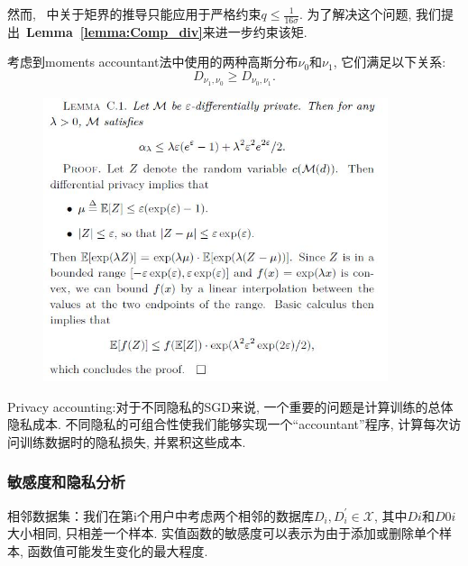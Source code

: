 
然而, ~\cite{abadi2016DLwithDP}中关于矩界的推导只能应用于严格约束$q \leq \frac{1}{16\sigma}$. 
为了解决这个问题, 我们提出~\textbf{Lemma~\ref{lemma:Comp_div}}来进一步约束该矩. 
\begin{lemma}

考虑到moments accountant法中使用的两种高斯分布$\nu_{0}$和$\nu_{1}$, 它们满足以下关系: 
\begin{equation}
D_{\nu_{1},\nu_{0}}\geq D_{\nu_{0},\nu_{1}}.
\end{equation}
\end{lemma}


\begin{figure}
    \includegraphics[width=0.9\textwidth]{figures/CDP/moment_bound.jpg}
\end{figure}

Privacy accounting:对于不同隐私的SGD来说, 一个重要的问题是计算训练的总体隐私成本. 不同隐私的可组合性使我们能够实现一个“accountant”程序, 计算每次访问训练数据时的隐私损失, 并累积这些成本. 
\cite{abadi2016DLwithDP, mcsherry2009privacy}
 
\subsubsection{敏感度和隐私分析}

相邻数据集：我们在第i个用户中考虑两个相邻的数据库$D_i, D_i^\prime \in\mathcal{X} $, 其中$Di$和$D0i$大小相同, 只相差一个样本. 
实值函数的敏感度可以表示为由于添加或删除单个样本,  函数值可能发生变化的最大程度. 
 
